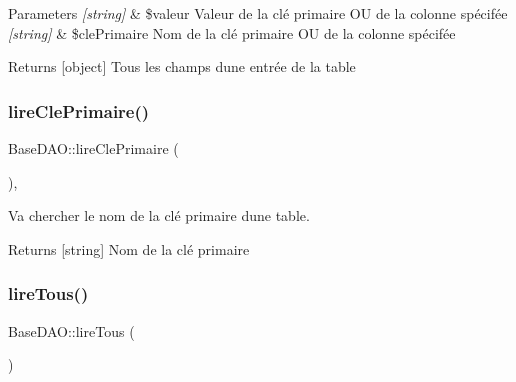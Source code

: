 \begin{DoxyParams}{Parameters}
{\em \mbox{[}string\mbox{]}} & \$valeur Valeur de la clé primaire OU de la colonne spécifée \\
\hline
{\em \mbox{[}string\mbox{]}} & \$cle\+Primaire Nom de la clé primaire OU de la colonne spécifée \\
\hline
\end{DoxyParams}
\begin{DoxyReturn}{Returns}
\mbox{[}object\mbox{]} Tous les champs d\textquotesingle{}une entrée de la table 
\end{DoxyReturn}
\mbox{\label{class_base_d_a_o_a2f23af522b46d32e9327279dab722579}} 
\subsubsection{\texorpdfstring{lire\+Cle\+Primaire()}{lireClePrimaire()}}
{\footnotesize\ttfamily Base\+D\+A\+O\+::lire\+Cle\+Primaire (\begin{DoxyParamCaption}{ }\end{DoxyParamCaption})\hspace{0.3cm}{\ttfamily [final]}, {\ttfamily [protected]}}



Va chercher le nom de la clé primaire d\textquotesingle{}une table. 

\begin{DoxyReturn}{Returns}
\mbox{[}string\mbox{]} Nom de la clé primaire 
\end{DoxyReturn}
\mbox{\label{class_base_d_a_o_a32c8bf9c85d3429f33a1bf26d274344f}} 
\subsubsection{\texorpdfstring{lire\+Tous()}{lireTous()}}
{\footnotesize\ttfamily Base\+D\+A\+O\+::lire\+Tous (\begin{DoxyParamCaption}{ }\end{DoxyParamCaption})\hspace{0.3cm}{\ttfamily [protected]}}



